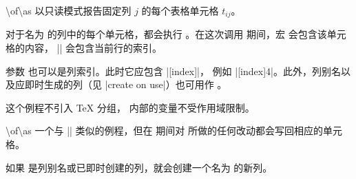 \documentclass[a4paper,doc2]{ltxdoc}
\begin{document}
\begin{command}{\pgfplotstableforeachcolumnelement{}\textbackslash of\textbackslash as}
    以只读模式报告固定列 $j$ 的每个表格单元格 $t_{ij}$。

    对于名为  的列中的每个单元格，都会执行 。在这次调用
    期间，宏  会包含该单元格的内容，
    |\pgfplotstablerow| 会包含当前行的索引。
\begin{codeexample}[]
\begin{minipage}{0.8\linewidth}
\loadedtable
{}\of\loadedtable\as{}
\end{minipage}
\end{codeexample}
    参数  也可以是列索引。此时它应包含 |[index]|，
    例如 |[index]4|。此外，列别名以及应即时生成的列（见 |create on use|）也可用作
    。

    这个例程不引入 \TeX{} 分组， 内部的变量不受作用域限制。
\end{command}

\begin{command}{\pgfplotstablemodifyeachcolumnelement{}\textbackslash of\textbackslash as}
    一个与 |\pgfplotstableforeachcolumnelement| 类似的例程，但在  期间对
     所做的任何改动都会写回相应的单元格。
\begin{codeexample}[]
\loadedtable
{}\of\loadedtable\as\cell{%
    \edef\cell{\#\pgfplotstablerow: \cell}%
}
\pgfplotstabletypeset[columns=error1,string type]{\loadedtable}
\end{codeexample}

    如果  是列别名或已即时创建的列，就会创建一个名为
     的新列。
\end{command}
\end{document}
